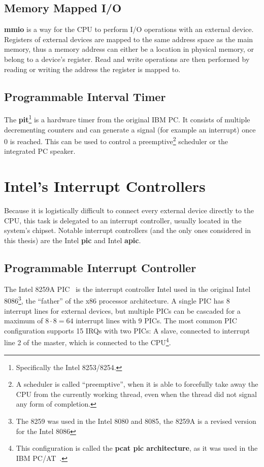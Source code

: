 \subsection{Memory Mapped I/O}
\label{subsec:mmio}

\textbf{\gls{mmio}} is a way for the CPU to perform I/O operations with an external device.
Registers of external devices are mapped to the same address space as the main memory, thus a
memory address can either be a location in physical memory, or belong to a device's register. Read
and write operations are then performed by reading or writing the address the register is mapped
to.

\subsection{Programmable Interval Timer}
\label{subsec:pit}

The \textbf{\gls{pit}}\footnote{Specifically the Intel 8253/8254.} is a hardware timer from the
original IBM PC. It consists of multiple decrementing counters and can generate a signal (for
example an interrupt) once 0 is reached. This can be used to control a preemptive\footnote{A
  scheduler is called ``preemptive'', when it is able to forcefully take away the CPU from the
  currently working thread, even when the thread did not signal any form of completion.} scheduler or
the integrated PC speaker.

\section{Intel's Interrupt Controllers}
\label{sec:intelcontrollers}

Because it is logistically difficult to connect every external device directly to the CPU, this
task is delegated to an interrupt controller, usually located in the system's chipset. Notable
interrupt controllers (and the only ones considered in this thesis) are the Intel
\textbf{\gls{pic}} and Intel \textbf{\gls{apic}}.

\subsection{Programmable Interrupt Controller}
\label{subsec:intelpic}

The Intel 8259A PIC~\cite{pic} is the interrupt controller Intel used in the original Intel
8086\footnote{The 8259 was used in the Intel 8080 and 8085, the 8259A is a revised version for the
  Intel 8086}, the ``father'' of the x86 processor architecture. A single PIC has 8 interrupt lines
for external devices, but multiple PICs can be cascaded for a maximum of \(8 \cdot 8 = 64\)
interrupt lines with 9 PICs. The most common PIC configuration supports 15 IRQs with two PICs: A
slave, connected to interrupt line 2 of the master, which is connected to the CPU\footnote{This
  configuration is called the \textbf{\gls{pcat pic architecture}}, as it was used in the IBM
  PC/AT~\cite[sec.~1.13]{pcat}.}.

